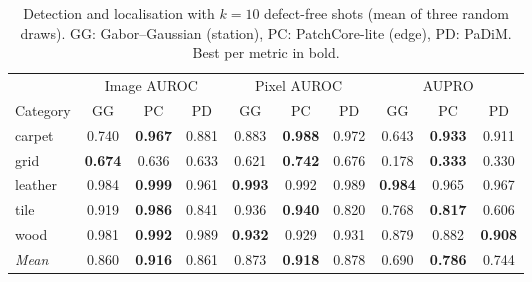 \begin{table}[t]
\centering
\caption{Detection and localisation with $k=10$ defect-free shots (mean of three random draws). GG: Gabor--Gaussian (station), PC: PatchCore-lite (edge), PD: PaDiM. Best per metric in bold.}
\label{tab:k10}
\footnotesize
\begin{tabular}{@{}lccccccccc@{}}
\toprule
& \multicolumn{3}{c}{Image AUROC} & \multicolumn{3}{c}{Pixel AUROC} & \multicolumn{3}{c}{AUPRO} \\
\cmidrule(lr){2-4}\cmidrule(lr){5-7}\cmidrule(l){8-10}
Category & GG & PC & PD & GG & PC & PD & GG & PC & PD \\
\midrule
carpet & 0.740 & \textbf{0.967} & 0.881 & 0.883 & \textbf{0.988} & 0.972 & 0.643 & \textbf{0.933} & 0.911 \\
grid & \textbf{0.674} & 0.636 & 0.633 & 0.621 & \textbf{0.742} & 0.676 & 0.178 & \textbf{0.333} & 0.330 \\
leather & 0.984 & \textbf{0.999} & 0.961 & \textbf{0.993} & 0.992 & 0.989 & \textbf{0.984} & 0.965 & 0.967 \\
tile & 0.919 & \textbf{0.986} & 0.841 & 0.936 & \textbf{0.940} & 0.820 & 0.768 & \textbf{0.817} & 0.606 \\
wood & 0.981 & \textbf{0.992} & 0.989 & \textbf{0.932} & 0.929 & 0.931 & 0.879 & 0.882 & \textbf{0.908} \\ \midrule
\textit{Mean} & 0.860 & \textbf{0.916} & 0.861 & 0.873 & \textbf{0.918} & 0.878 & 0.690 & \textbf{0.786} & 0.744 \\
\bottomrule
\end{tabular}
\end{table}

